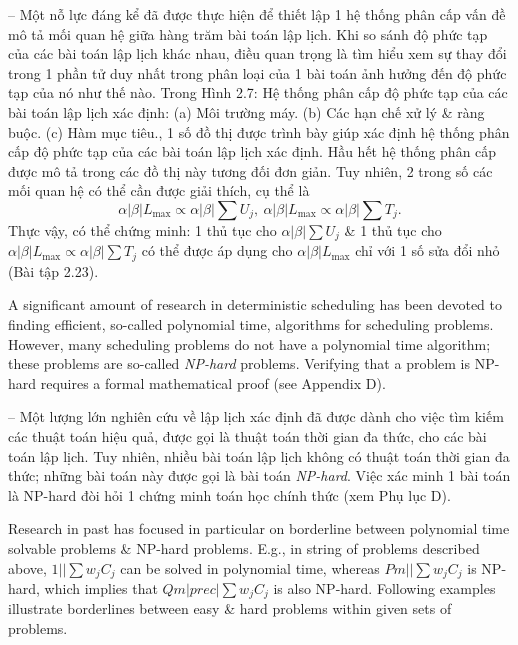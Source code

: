\documentclass{article}
\begin{document}
\begin{itemize}
\begin{itemize}
        -- Một nỗ lực đáng kể đã được thực hiện để thiết lập 1 hệ thống phân cấp vấn đề mô tả mối quan hệ giữa hàng trăm bài toán lập lịch. Khi so sánh độ phức tạp của các bài toán lập lịch khác nhau, điều quan trọng là tìm hiểu xem sự thay đổi trong 1 phần tử duy nhất trong phân loại của 1 bài toán ảnh hưởng đến độ phức tạp của nó như thế nào. Trong {\sf Hình 2.7: Hệ thống phân cấp độ phức tạp của các bài toán lập lịch xác định: (a) Môi trường máy. (b) Các hạn chế xử lý \& ràng buộc. (c) Hàm mục tiêu.}, 1 số đồ thị được trình bày giúp xác định hệ thống phân cấp độ phức tạp của các bài toán lập lịch xác định. Hầu hết hệ thống phân cấp được mô tả trong các đồ thị này tương đối đơn giản. Tuy nhiên, 2 trong số các mối quan hệ có thể cần được giải thích, cụ thể là
        \begin{equation*}
            \alpha|\beta|L_{\max}\propto\alpha|\beta|\sum U_j,\ \alpha|\beta|L_{\max}\propto\alpha|\beta|\sum T_j.
        \end{equation*}
        Thực vậy, có thể chứng minh: 1 thủ tục cho $\alpha|\beta|\sum U_j$ \& 1 thủ tục cho $\alpha|\beta|L_{\max}\propto\alpha|\beta|\sum T_j$ có thể được áp dụng cho $\alpha|\beta|L_{\max}$ chỉ với 1 số sửa đổi nhỏ (Bài tập 2.23).

        A significant amount of research in deterministic scheduling has been devoted to finding efficient, so-called polynomial time, algorithms for scheduling problems. However, many scheduling problems do not have a polynomial time algorithm; these problems are so-called {\it NP-hard} problems. Verifying that a problem is NP-hard requires a formal mathematical proof (see Appendix D).

        -- Một lượng lớn nghiên cứu về lập lịch xác định đã được dành cho việc tìm kiếm các thuật toán hiệu quả, được gọi là thuật toán thời gian đa thức, cho các bài toán lập lịch. Tuy nhiên, nhiều bài toán lập lịch không có thuật toán thời gian đa thức; những bài toán này được gọi là bài toán {\it NP-hard}. Việc xác minh 1 bài toán là NP-hard đòi hỏi 1 chứng minh toán học chính thức (xem Phụ lục D).

        Research in past has focused in particular on borderline between polynomial time solvable problems \& NP-hard problems. E.g., in string of problems described above, $1||\sum w_jC_j$ can be solved in polynomial time, whereas $Pm||\sum w_jC_j$ is NP-hard, which implies that $Qm|prec|\sum w_jC_j$ is also NP-hard. Following examples illustrate borderlines between easy \& hard problems within given sets of problems.


\end{itemize}
\end{itemize}
\end{document}
